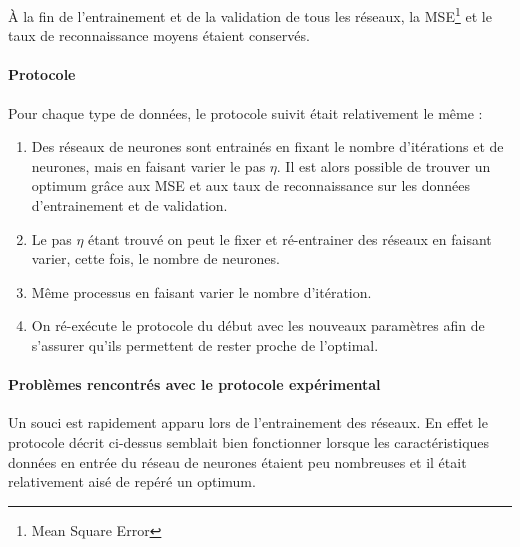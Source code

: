 À la fin de l'entrainement et de la validation de tous les réseaux, la MSE\footnote{Mean Square Error} et le taux de reconnaissance moyens étaient conservés.

\paragraph{Protocole} Pour chaque type de données, le protocole suivit était relativement le même :
\begin{enumerate}
\item Des réseaux de neurones sont entrainés en fixant le nombre d'itérations et de neurones, mais en faisant varier le pas $\eta$. Il est alors possible de trouver un optimum grâce aux MSE et aux taux de reconnaissance sur les données d'entrainement et de validation.
\item Le pas $\eta$ étant trouvé on peut le fixer et ré-entrainer des réseaux en faisant varier, cette fois, le nombre de neurones.
\item Même processus en faisant varier le nombre d'itération.
\item On ré-exécute le protocole du début avec les nouveaux paramètres afin de s'assurer qu'ils permettent de rester proche de l'optimal.
\end{enumerate} 

\paragraph{Problèmes rencontrés avec le protocole expérimental}
Un souci est rapidement apparu lors de l'entrainement des réseaux. En effet le protocole décrit ci-dessus semblait bien fonctionner lorsque les caractéristiques données en entrée du réseau de neurones étaient peu nombreuses et il était relativement aisé de repéré un optimum.

